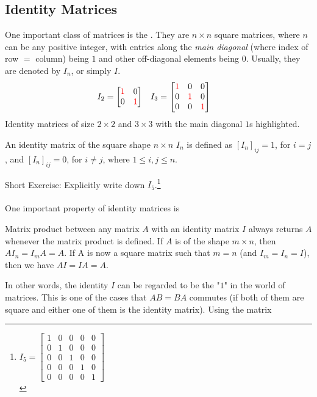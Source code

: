 \subsection{Identity Matrices}
One important class of matrices is the . They are $n \times n$ square matrices, where $n$ can be any positive integer, with entries along the \textit{main diagonal} (where index of row $=$ column) being $1$ and other off-diagonal elements being $0$. Usually, they are denoted by $I_n$, or simply $I$.
\begin{align*}
I_2 &= 
\begin{bmatrix}
\textcolor{red}{1} & 0 \\
0 & \textcolor{red}{1}
\end{bmatrix}
& I_3 &= 
\begin{bmatrix}
\textcolor{red}{1} & 0 & 0 \\
0 & \textcolor{red}{1} & 0 \\
0 & 0 & \textcolor{red}{1}
\end{bmatrix}
\end{align*}
Identity matrices of size $2 \times 2$ and $3 \times 3$ with the main diagonal $1$s highlighted.
\begin{defn}
An identity matrix of the square shape $n \times n$ $I_n$ is defined as $[I_{n}]_{ij} = 1$, for $i = j$, and $[I_{n}]_{ij} = 0$, for $i \neq j$, where $1 \leq i,j \leq n$.
\end{defn}
Short Exercise: Explicitly write down $I_5$.\footnote{$I_5=
\begin{bmatrix}
1 & 0 & 0 & 0 & 0 \\
0 & 1 & 0 & 0 & 0 \\
0 & 0 & 1 & 0 & 0 \\
0 & 0 & 0 & 1 & 0 \\
0 & 0 & 0 & 0 & 1
\end{bmatrix}$\\}\\
\\
One important property of identity matrices is
\begin{proper}
\label{proper:identity}
Matrix product between any matrix $A$ with an identity matrix $I$ always returns $A$ whenever the matrix product is defined. If $A$ is of the shape $m \times n$, then $AI_n = I_mA = A$. If A is now a square matrix such that $m=n$ (and $I_m = I_n = I$), then we have $AI = IA = A$.
\end{proper}
In other words, the identity $I$ can be regarded to be the "$1$" in the world of matrices. This is one of the cases that $AB = BA$ commutes (if both of them are square and either one of them is the identity matrix). Using the matrix
